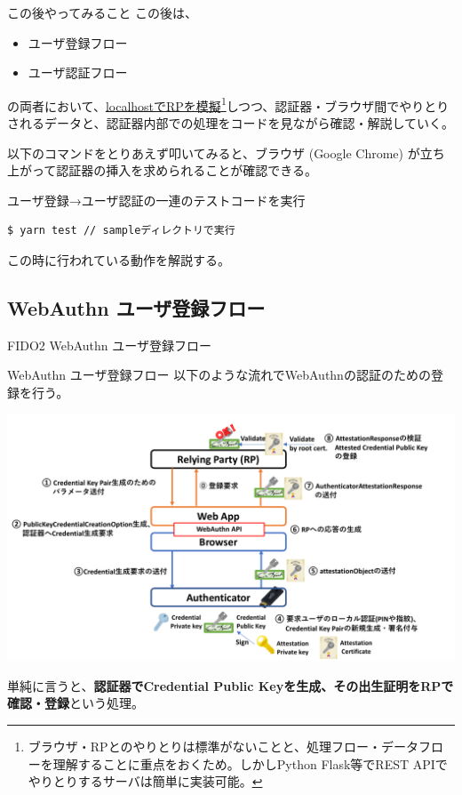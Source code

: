 \documentclass[12pt,dvipdfmx,uplatex]{beamer}
\begin{document}
\begin{frame}{この後やってみること}
\small
この後は、
\begin{itemize}
 \item ユーザ登録フロー 
 \item ユーザ認証フロー
\end{itemize}
の両者において、\ul{localhostでRPを模擬}\footnote[frame]{\scriptsize ブラウザ・RPとのやりとりは標準がないことと、処理フロー・データフローを理解することに重点をおくため。しかしPython Flask等でREST APIでやりとりするサーバは簡単に実装可能。}しつつ、認証器・ブラウザ間でやりとりされるデータと、認証器内部での処理をコードを見ながら確認・解説していく。
\end{frame}

\begin{frame}[fragile]
以下のコマンドをとりあえず叩いてみると、ブラウザ (Google Chrome) が立ち上がって認証器の挿入を求められることが確認できる。

\begin{exampleblock}{\footnotesize ユーザ登録→ユーザ認証の一連のテストコードを実行}
\footnotesize
\begin{verbatim}
$ yarn test // sampleディレクトリで実行
\end{verbatim}
\end{exampleblock}

この時に行われている動作を解説する。
\end{frame}


\subsection{WebAuthn ユーザ登録フロー}

\begin{frame}
\centering
{\Large FIDO2 WebAuthn ユーザ登録フロー}
\end{frame}


\begin{frame}{WebAuthn ユーザ登録フロー}
以下のような流れでWebAuthnの認証のための登録を行う。
\begin{center}
\includegraphics[width=0.9\linewidth]{Figs/webauthn-registration0.pdf}
\end{center}
単純に言うと、\textbf{認証器でCredential Public Keyを生成、その出生証明をRPで確認・登録}という処理。

\end{frame}
\end{document}
